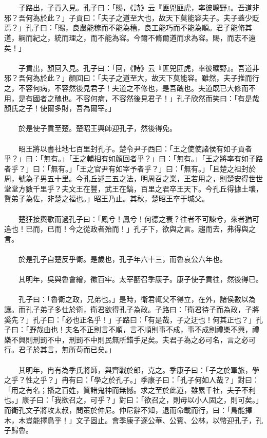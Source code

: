 \\\\
　　子路出，子貢入見。孔子曰：「賜，《詩》云『匪兕匪虎，率彼曠野』。吾道非邪？吾何為於此？」子貢曰：「夫子之道至大也，故天下莫能容夫子。夫子蓋少貶焉？」孔子曰：「賜，良農能稼而不能為穡，良工能巧而不能為順。君子能脩其道，綱而紀之，統而理之，而不能為容。今爾不脩爾道而求為容。賜，而志不遠矣！」
\\\\
　　子貢出，顏回入見。孔子曰：「回，《詩》云『匪兕匪虎，率彼曠野』。吾道非邪？吾何為於此？」顏回曰：「夫子之道至大，故天下莫能容。雖然，夫子推而行之，不容何病，不容然後見君子！夫道之不修也，是吾醜也。夫道既已大修而不用，是有國者之醜也。不容何病，不容然後見君子！」孔子欣然而笑曰：「有是哉顏氏之子！使爾多財，吾為爾宰。」
\\\\
　　於是使子貢至楚。楚昭王興師迎孔子，然後得免。
\\\\
　　昭王將以書社地七百里封孔子。楚令尹子西曰：「王之使使諸侯有如子貢者乎？」曰：「無有。」「王之輔相有如顏回者乎？」曰：「無有。」「王之將率有如子路者乎？」曰：「無有。」「王之官尹有如宰予者乎？」曰：「無有。」「且楚之祖封於周，號為子男五十里。今孔丘述三五之法，明周召之業，王若用之，則楚安得世世堂堂方數千里乎？夫文王在豐，武王在鎬，百里之君卒王天下。今孔丘得據土壤，賢弟子為佐，非楚之福也。」昭王乃止。其秋，楚昭王卒于城父。
\\\\
　　楚狂接輿歌而過孔子曰：「鳳兮！鳳兮！何德之衰？往者不可諫兮，來者猶可追也！已而，已而！今之從政者殆而！」孔子下，欲與之言。趨而去，弗得與之言。
\\\\
　　於是孔子自楚反乎衛。是歲也，孔子年六十三，而魯哀公六年也。
\\\\
　　其明年，吳與魯會繒，徵百牢。太宰嚭召季康子。康子使子貢往，然後得已。
\\\\
　　孔子曰：「魯衛之政，兄弟也。」是時，衛君輒父不得立，在外，諸侯數以為讓。而孔子弟子多仕於衛，衛君欲得孔子為政。子路曰：「衛君待子而為政，子將奚先？」孔子曰：「必也正名乎！」子路曰：「有是哉，子之迂也！何其正也？」孔子曰：「野哉由也！夫名不正則言不順，言不順則事不成，事不成則禮樂不興，禮樂不興則刑罰不中，刑罰不中則民無所錯手足矣。夫君子為之必可名，言之必可行。君子於其言，無所苟而已矣。」
\\\\
　　其明年，冉有為季氏將師，與齊戰於郎，克之。季康子曰：「子之於軍旅，學之乎？性之乎？」冉有曰：「學之於孔子。」季康子曰：「孔子何如人哉？」對曰：「用之有名；播之百姓，質諸鬼神而無憾。求之至於此道，雖累千社，夫子不利也。」康子曰：「我欲召之，可乎？」對曰：「欲召之，則毋以小人固之，則可矣。」而衛孔文子將攻太叔，問策於仲尼。仲尼辭不知，退而命載而行，曰：「鳥能擇木，木豈能擇鳥乎！」文子固止。會季康子逐公華、公賓、公林，以幣迎孔子，孔子歸魯。
